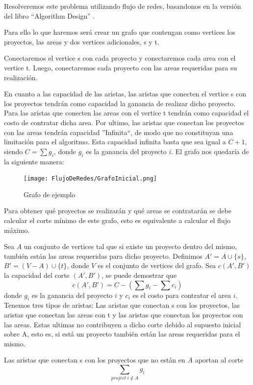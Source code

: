 Resolveremos este problema utilizando flujo de redes, basandonos en la versión del libro ``Algorithm Design'' \cite{ALGORITHMDESIGN}.

Para ello lo que haremos será crear un grafo que contengan como vertices los proyectos, las areas y dos vertices adicionales, s y t.

Conectaremos el vertice s con cada proyecto y conectaremos cada area con el vertice t.
Luego, conectaremos cada proyecto con las areas requeridas para su realización.

En cuanto a las capacidad de las aristas, las aristas que conecten el vertice s con los proyectos tendrán como capacidad la ganancia de realizar dicho proyecto. Para las aristas que conecten las areas 
con el vertice t tendrán como capacidad el costo de contratar dicha area. Por ultimo, las aristas que conectan los proyectos con las areas tendrán capacidad ''Infinita``, de modo que no constituyan 
una limitación para el algoritmo. Esta capacidad infinita basta que sea igual a $ C + 1 $, siendo $ C = \sum g_i $, donde $g_i$ es la ganancia del proyecto $i$.
\newpage
El grafo nos quedaría de la siguiente manera:

\begin{figure}[H]
\centering
\texttt{[image: FlujoDeRedes/GrafoInicial.png]}
\caption{Grafo de ejemplo}
\end{figure}

Para obtener qué proyectos se realizarán y qué areas se contratarán se debe calcular el corte mínimo de este grafo, esto es equivalente a calcular el flujo máximo. 


Sea $A$ un conjunto de vertices tal que si existe un proyecto dentro del mismo, también están las areas requeridas para dicho proyecto.
Definimos $A' = A \cup \{s\}$, $B' = (V - A) \cup \{t\}$, donde $V$ es el conjunto de vertices del grafo.
Sea $c(A',B')$ la capacidad del corte $(A',B')$, se puede demostrar que 
$$c(A', B') = C - \left(\sum g_i - \sum c_i\right)$$
donde $g_i$ es la ganancia del proyecto $i$ y $c_i$ es el costo para contratar el area $i$.
Tenemos tres tipos de aristas: Las aristas que conectan s con los proyectos, las aristas que conectan las areas con t y las aristas que conectan los proyectos con las areas.
Estas ultimas no contribuyen a dicho corte debido al supuesto inicial sobre A, esto es, si está un proyecto también están las areas requeridas para el mismo.

Las aristas que conectan s con los proyectos que no están en $A$ aportan al corte
$$ \sum_{project\ i \notin A} g_i $$

